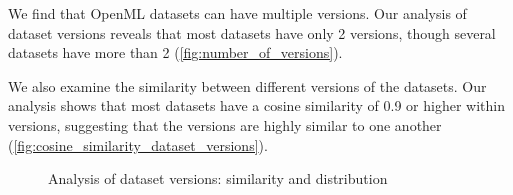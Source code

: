 We find that OpenML datasets can have multiple versions. Our analysis of dataset versions reveals that most datasets have only 2 versions, though several datasets have more than 2 (\cref{fig:number_of_versions}).


We also examine the similarity between different versions of the datasets. Our analysis shows that most datasets have a cosine similarity of 0.9 or higher within versions, suggesting that the versions are highly similar to one another (\cref{fig:cosine_similarity_dataset_versions}).


\begin{figure}[h]
    \centering
    \hfill
    \caption{Analysis of dataset versions: similarity and distribution}
    \label{fig:dataset_version_analysis}
\end{figure}


